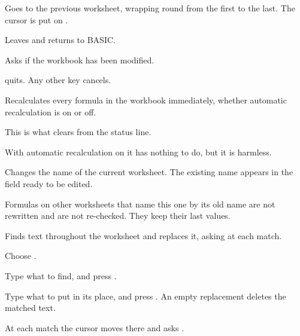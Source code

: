 
Goes to the previous worksheet, wrapping round from the first to the last. The
cursor is put on .


Leaves \ccprod{} and returns to BASIC.

\begin{ccsteps}
\item Asks  if the workbook has been modified.
\item {} quits. Any other key cancels.
\end{ccsteps}


Recalculates every formula in the workbook immediately, whether automatic
recalculation is on or off.

\begin{ccsteps}
\item This is what clears  from the status line.
\item With automatic recalculation on it has nothing to do, but it is harmless.
\end{ccsteps}


Changes the name of the current worksheet. The existing name appears in the
field ready to be edited.

\begin{ccsteps}
\item Formulas on other worksheets that name this one by its old name are not
rewritten and are not re-checked. They keep their last values.
\end{ccsteps}


Finds text throughout the worksheet and replaces it, asking at each match.

\begin{ccprocedure}[]
\item Choose .
\item Type what to find, and press .
\item Type what to put in its place, and press . An empty
replacement deletes the matched text.
\item At each match the cursor moves there and \ccprod{} asks
.
\end{ccprocedure}

